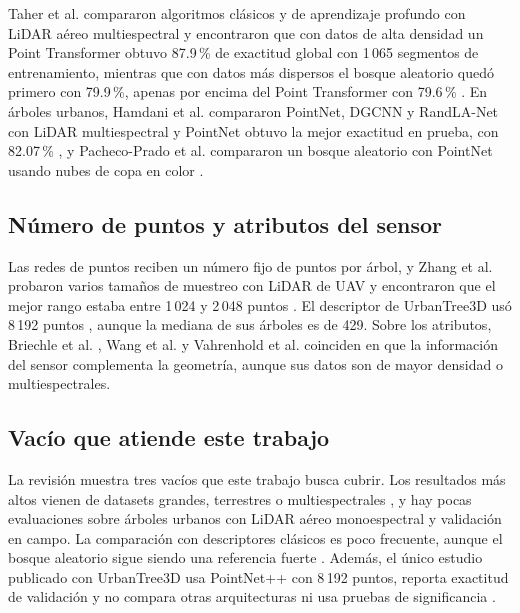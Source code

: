 \documentclass[preprint,12pt]{elsarticle}
\begin{document}
Taher et al. compararon algoritmos clásicos y de aprendizaje profundo con LiDAR aéreo multiespectral y encontraron que con datos de alta densidad un Point Transformer obtuvo 87.9\,\% de exactitud global con 1\,065 segmentos de entrenamiento, mientras que con datos más dispersos el bosque aleatorio quedó primero con 79.9\,\%, apenas por encima del Point Transformer con 79.6\,\% \cite{taher2026msals}. En árboles urbanos, Hamdani et al. compararon PointNet, DGCNN y RandLA-Net con LiDAR multiespectral y PointNet obtuvo la mejor exactitud en prueba, con 82.07\,\% \cite{hamdani2026classification}, y Pacheco-Prado et al. compararon un bosque aleatorio con PointNet usando nubes de copa en color \cite{pacheco2025urban}.

\subsection{Número de puntos y atributos del sensor}

Las redes de puntos reciben un número fijo de puntos por árbol, y Zhang et al. probaron varios tamaños de muestreo con LiDAR de UAV y encontraron que el mejor rango estaba entre 1\,024 y 2\,048 puntos \cite{zhang2025uav}. El descriptor de UrbanTree3D usó 8\,192 puntos \cite{hamdani2026urbantree3d}, aunque la mediana de sus árboles es de 429. Sobre los atributos, Briechle et al. \cite{briechle2020pointnetpp}, Wang et al. \cite{wang2024rse} y Vahrenhold et al. \cite{vahrenhold2025mmtscnet} coinciden en que la información del sensor complementa la geometría, aunque sus datos son de mayor densidad o multiespectrales.

\subsection{Vacío que atiende este trabajo}

La revisión muestra tres vacíos que este trabajo busca cubrir. Los resultados más altos vienen de datasets grandes, terrestres o multiespectrales \cite{puliti2025forspecies,taher2026msals}, y hay pocas evaluaciones sobre árboles urbanos con LiDAR aéreo monoespectral y validación en campo. La comparación con descriptores clásicos es poco frecuente, aunque el bosque aleatorio sigue siendo una referencia fuerte \cite{briechle2020pointnetpp,taher2026msals}. Además, el único estudio publicado con UrbanTree3D usa PointNet++ con 8\,192 puntos, reporta exactitud de validación y no compara otras arquitecturas ni usa pruebas de significancia \cite{hamdani2026urbantree3d}.
\end{document}
